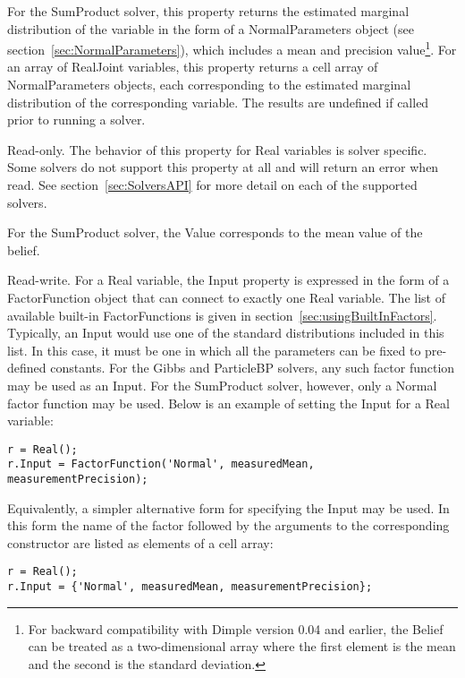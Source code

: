 For the SumProduct solver, this property returns the estimated marginal distribution of the variable in the form of a NormalParameters object (see section~\ref{sec:NormalParameters}), which includes a mean and precision value\ifmatlab\footnote{For backward compatibility with Dimple version 0.04 and earlier, the Belief can be treated as a two-dimensional array where the first element is the mean and the second is the standard deviation.}\fi.  \ifmatlab For an array of RealJoint variables, this property returns a cell array of NormalParameters objects, each corresponding to the estimated marginal distribution of the corresponding variable. \fi The results are undefined if called prior to running a solver.



Read-only.  The behavior of this property for Real variables is solver specific.  Some solvers do not support this property at all and will return an error when read.  See section~\ref{sec:SolversAPI} for more detail on each of the supported solvers.

For the SumProduct solver, the Value corresponds to the mean value of the belief.



Read-write.  For a Real variable, the Input property is expressed in the form of a FactorFunction object that can connect to exactly one Real variable.  The list of available built-in FactorFunctions is given in section~\ref{sec:usingBuiltInFactors}.  Typically, an Input would use one of the standard distributions included in this list.  In this case, it must be one in which all the parameters can be fixed to pre-defined constants.  For the Gibbs and ParticleBP solvers, any such factor function may be used as an Input.  For the SumProduct solver, however, only a Normal factor function may be used.  Below is an example of setting the Input for a Real variable:

\ifmatlab

\begin{lstlisting}
r = Real();
r.Input = FactorFunction('Normal', measuredMean, measurementPrecision);
\end{lstlisting}

Equivalently, a simpler alternative form for specifying the Input may be used.  In this form the name of the factor followed by the arguments to the corresponding constructor are listed as elements of a cell array:

\begin{lstlisting}
r = Real();
r.Input = {'Normal', measuredMean, measurementPrecision};
\end{lstlisting}

